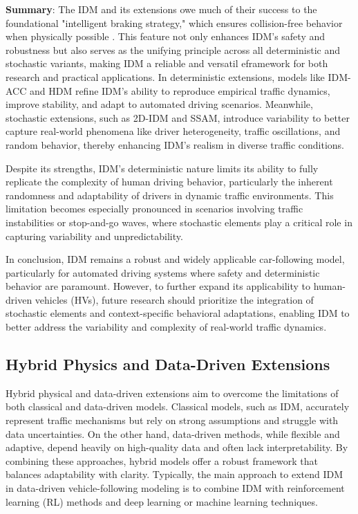 \documentclass[a4paper,fleqn]{cas-sc}
\begin{document}
\textbf{Summary}: The IDM and its extensions owe much of their success to the foundational "intelligent braking strategy," which ensures collision-free behavior when physically possible \cite{treiberTrafficFlowDynamics2013}. This feature not only enhances IDM's safety and robustness but also serves as the unifying principle across all deterministic and stochastic variants, making IDM a reliable and versatil eframework for both research and practical applications. In deterministic extensions, models like IDM-ACC and HDM refine IDM's ability to reproduce empirical traffic dynamics, improve stability, and adapt to automated driving scenarios. Meanwhile, stochastic extensions, such as 2D-IDM and SSAM, introduce variability to better capture real-world phenomena like driver heterogeneity, traffic oscillations, and random behavior, thereby enhancing IDM's realism in diverse traffic conditions.

Despite its strengths, IDM's deterministic nature limits its ability to fully replicate the complexity of human driving behavior, particularly the inherent randomness and adaptability of drivers in dynamic traffic environments. This limitation becomes especially pronounced in scenarios involving traffic instabilities or stop-and-go waves, where stochastic elements play a critical role in capturing variability and unpredictability.

In conclusion, IDM remains a robust and widely applicable car-following model, particularly for automated driving systems where safety and deterministic behavior are paramount. However, to further expand its applicability to human-driven vehicles (HVs), future research should prioritize the integration of stochastic elements and context-specific behavioral adaptations, enabling IDM to better address the variability and complexity of real-world traffic dynamics.

\subsection{Hybrid Physics and Data-Driven Extensions}

Hybrid physical and data-driven extensions aim to overcome the limitations of both classical and data-driven models. Classical models, such as IDM, accurately represent traffic mechanisms but rely on strong assumptions and struggle with data uncertainties. On the other hand, data-driven methods, while flexible and adaptive, depend heavily on high-quality data and often lack interpretability. By combining these approaches, hybrid models offer a robust framework that balances adaptability with clarity. Typically, the main approach to extend IDM in data-driven vehicle-following modeling is to combine IDM with reinforcement learning (RL) methods and deep learning or machine learning techniques.
\end{document}
